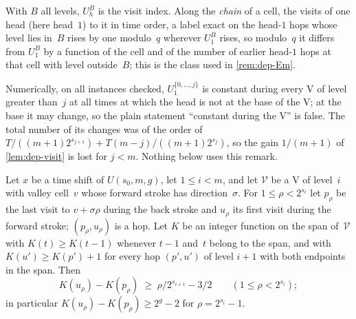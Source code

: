 With $B$ all levels, $U_h^B$ is the visit index. Along the \emph{chain} of a cell, the visits of one head (here head~$1$) to it
in time order, a label exact on the head-$1$ hops whose
level lies in~$B$ rises by one modulo~$q$ wherever $U_1^B$ rises, so modulo~$q$ it differs from $U_1^B$ by a function
of the cell and of the number of earlier head-$1$ hops at that cell with level outside~$B$; this is the class used in
\cref{rem:dep-Em}.

\begin{remark}\label{rem:dep-bandcount}
Numerically, on all instances checked, $U_1^{\{0,\dots,j\}}$ is constant during every V
of level greater than~$j$ at all times at which the head is not at the base of the V; at the base it may change, so the
plain statement ``constant during the V'' is false. The total number of its changes was of the order of
$T/((m+1)2^{s_{j+1}})+T(m-j)/((m+1)2^{s_j})$, so the gain $1/(m+1)$ of \cref{lem:dep-visit} is lost for $j<m$.
Nothing below uses this remark.
\end{remark}

\begin{lemma}\label{lem:dep-monotone}
\notformalized
Let $x$ be a time shift of $U(s_0,m,g)$, let $1\le i<m$, and let $\mathcal V$ be a V of level~$i$ with valley
cell~$v$ whose forward stroke has direction~$\sigma$. For $1\le\rho<2^{s_i}$ let $p_\rho$ be the last visit to
$v+\sigma\rho$ during the back stroke and $u_\rho$ its first visit during the forward stroke; $(p_\rho,u_\rho)$ is a
hop. Let $K$ be an integer function on the span of~$\mathcal V$ with $K(t)\ge K(t-1)$ whenever $t-1$ and~$t$ belong to
the span, and with $K(u')\ge K(p')+1$ for every hop $(p',u')$ of level $i+1$ with both endpoints in the span. Then
\[
  K(u_\rho)-K(p_\rho)\;\ge\;\rho/2^{s_{i+1}}-3/2\qquad(1\le\rho<2^{s_i});
\]
in particular $K(u_\rho)-K(p_\rho)\ge2^g-2$ for $\rho=2^{s_i}-1$.
\end{lemma}

